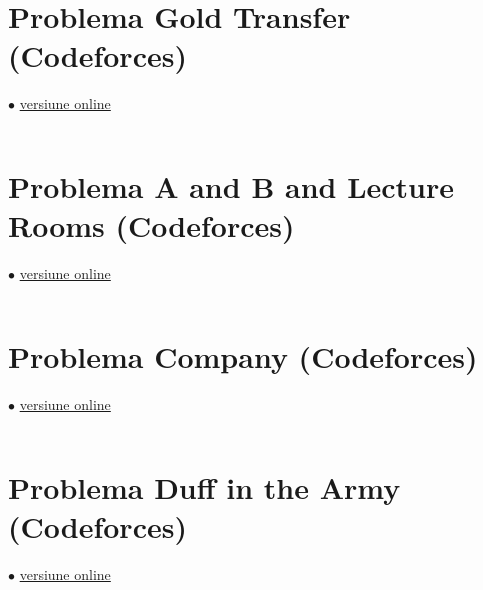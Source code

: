 \documentclass[../main.tex]{subfiles}
\begin{document}
\inputminted{cpp}{../src/trees/lca-tarjan-stl.cpp}

\section{Problema Gold Transfer (Codeforces)}
\label{code:gold-transfer}
$\bullet$
\href{https://codeforces.com/contest/1535/submission/233745830}{versiune online}

\inputminted{cpp}{../src/trees/gold-transfer.cpp}

\section{Problema A and B and Lecture Rooms (Codeforces)}
\label{code:a-and-b-and-lecture-rooms}
$\bullet$
\href{https://codeforces.com/contest/519/submission/302352256}{versiune online}

\inputminted{cpp}{../src/trees/a-and-b-and-lecture-rooms.cpp}

\section{Problema Company (Codeforces)}
\label{code:company}
$\bullet$
\href{https://codeforces.com/contest/1062/submission/297245296}{versiune online}

\inputminted{cpp}{../src/trees/company.cpp}

\section{Problema Duff in the Army (Codeforces)}
\label{code:duff-in-the-army}
$\bullet$
\href{https://codeforces.com/contest/587/submission/357374368}{versiune online}

\inputminted{cpp}{../src/trees/duff-in-the-army.cpp}
\end{document}
